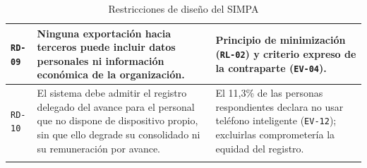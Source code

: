 \documentclass[11pt,a4paper]{article}
\newcommand{\id}[1]{\texttt{\begingroup\hyphenpenalty=10000\relax#1\endgroup}}
\renewcommand{\id}[1]{\texttt{#1}}
\begin{document}
\begin{longtable}{|C{1.5cm}|L{6.8cm}|L{6.6cm}|}
\id{RD-09} & Ninguna exportación hacia terceros puede incluir datos personales ni información económica de la organización. & Principio de minimización (\id{RL-02}) y criterio expreso de la contraparte (\id{EV-04}). \\ \hline
\id{RD-10} & El sistema debe admitir el registro delegado del avance para el personal que no dispone de dispositivo propio, sin que ello degrade su consolidado ni su remuneración por avance. & El 11{,}3\% de las personas respondientes declara no usar teléfono inteligente (\id{EV-12}); excluirlas comprometería la equidad del registro. \\ \hline
\caption{Restricciones de diseño del SIMPA}
\end{longtable}











\newpage
\nocite{wohlin2012,runeson2009,molleri2020,hennink2017,cohen1960,wilkinson2016,nosek2018}







\end{document}
